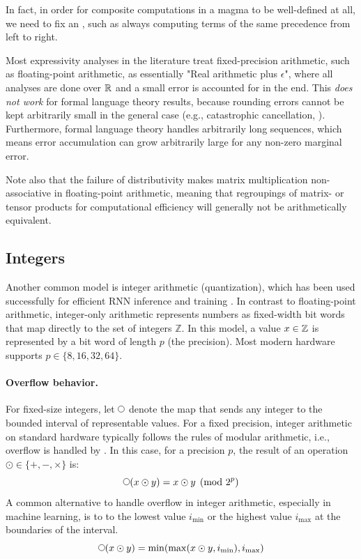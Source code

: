 \documentclass{article}
\begin{document}
In fact, in order for composite computations in a magma to be well-defined at all, we need to fix an , such as always computing terms of the same precedence from left to right.

\begin{remark}
    Most expressivity analyses in the literature treat fixed-precision arithmetic, such as floating-point arithmetic, as essentially "Real arithmetic plus $\epsilon$", where all analyses are done over $\mathbb{R}$ and a small error is accounted for in the end.
    This \emph{does not work} for formal language theory results, because rounding errors cannot be kept arbitrarily small in the general case (e.g., catastrophic cancellation, \citet{goldberg1991every}). Furthermore, formal language theory handles arbitrarily long sequences, which means error accumulation can grow arbitrarily large for any non-zero marginal error.
\end{remark}

Note also that the failure of distributivity makes matrix multiplication non-associative in floating-point arithmetic, meaning that regroupings of matrix- or tensor products for computational efficiency will generally not be arithmetically equivalent.

\subsection{Integers}
Another common model is integer arithmetic (quantization), which has been used successfully for efficient RNN inference \cite{jacob2018quantization,kim2021ibert,sari2021irnn} and training \cite{wang2022niti, nia2023irnn}. 
In contrast to floating-point arithmetic, integer-only arithmetic represents numbers as fixed-width bit words that map directly to the set of integers $\mathbb{Z}$. 
In this model, a value $x\in\mathbb{Z}$ is represented by a bit word of length $p$ (the precision). 
Most modern hardware supports $p \in \{8, 16, 32, 64\}$.

\paragraph{Overflow behavior.}
For fixed-size integers, let $\wrap$ denote the map that sends any integer to the bounded interval of representable values.
For a fixed precision, integer arithmetic on standard hardware typically follows the rules of modular arithmetic, i.e., overflow is handled by . 
In this case, for a precision $p$, the result of an operation $\odot\in\{+,-,\times\}$ is:
$$\wrap (x \odot y) = x \odot y \pmod{2^p}$$
A common alternative to handle overflow in integer arithmetic, especially in machine learning, is to  to the lowest value $i_{\min}$ or the highest value $i_{\max}$ at the boundaries of the interval.
$$\wrap (x \odot y) = \min(\max(x\odot y,i_{\min}),i_{\max})$$
\end{document}
